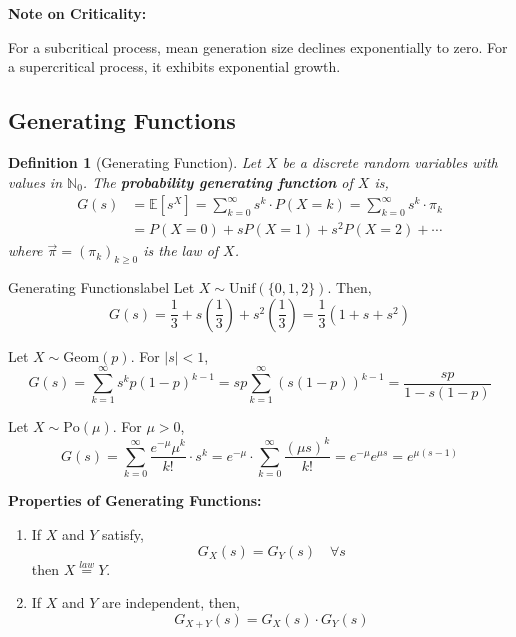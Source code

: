 \documentclass{tufte-handout}
\newtheorem{defn}[thm]{Definition}
\begin{document}
\begin{marginfigure}
  \textbf{Note on Criticality:}

  \noindent For a subcritical process, mean generation size declines exponentially to zero. For a supercritical process, it exhibits exponential growth.
\end{marginfigure}

\subsection{Generating Functions} 
\begin{defn}[Generating Function]
  Let $X$ be a discrete random variables with values in $\mathbb{N}_0$. The \textbf{probability generating function} of $X$ is,
  \begin{align*}
  G(s) &=\mathbb{E}[s^{X}]=\sum_{k=0}^{\infty} s^{k} \cdot P(X=k) =\sum_{k=0}^{\infty} s^{k} \cdot \pi_k \\
  &=P(X=0)+s P(X=1)+s^{2} P(X=2)+\cdots
  \end{align*}
  \noindent where $\Vec{\pi} = (\pi_k)_{k \geq 0}$ is the law of $X$.
  \end{defn}

  \begin{ex}{Generating Functions}{label}
    Let $X \sim \text{Unif}(\{0,1,2\})$. Then,
    \[G(s)=\frac{1}{3}+s\left(\frac{1}{3}\right)+s^{2}\left(\frac{1}{3}\right)=\frac{1}{3}\left(1+s+s^{2}\right)\]

    Let $X \sim \text{Geom}(p)$. For $|s| < 1$,
    \[G(s)=\sum_{k=1}^{\infty} s^{k} p(1-p)^{k-1}=s p \sum_{k=1}^{\infty}(s(1-p))^{k-1}=\frac{s p}{1-s(1-p)}\]

    Let $X \sim \text{Po}(\mu)$. For $\mu > 0$,
    \[G(s) = \sum_{k=0}^{\infty} \frac{e^{-\mu} \mu^{k}}{k !} \cdot s^{k} = e^{-\mu} \cdot \sum_{k=0}^{\infty} \frac{(\mu s)^{k}}{k !}=e^{-\mu} e^{\mu s} = e^{\mu(s-1)}\]
  \end{ex}

  \begin{marginfigure}
  \textbf{Properties of Generating Functions:}

    \begin{enumerate}
      \item If $X$ and $Y$ satisfy,
            \[G_X(s) = G_Y(s) \quad \forall s\]
            \noindent then $X \overset{law}{=} Y$.
      \item If $X$ and $Y$ are independent, then,
    \[G_{X+Y}(s) = G_X(s) \cdot G_Y(s)\]
    \end{enumerate}
  \end{marginfigure}
\end{document}
